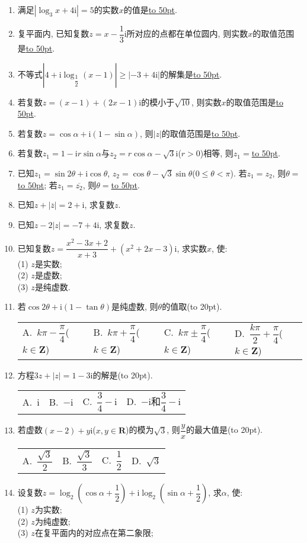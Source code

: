 \documentclass[10pt,a4paper]{article}
\newcommand{\blank}[1]{\underline{\hbox to #1pt{}}}
\newcommand{\bracket}[1]{(\hbox to #1pt{})}
\newcommand{\fourch}[4]{\par\begin{tabular}{p{.23\textwidth}p{.23\textwidth}p{.23\textwidth}p{.23\textwidth}}
A.~#1 &B.~#2& C.~#3& D.~#4
\end{tabular}}
\begin{document}
\begin{enumerate}[1.]
\item 满足$|\log _3x+4\mathrm{i}|=5$的实数$x$的值是\blank{50}.
\item 复平面内, 已知复数$z=x-\dfrac 13\mathrm{i}$所对应的点都在单位圆内, 则实数$x$的取值范围是\blank{50}.
\item 不等式$|4+\mathrm{i}\log _{\dfrac 12}(x-1)|\ge|-3+4\mathrm{i}|$的解集是\blank{50}.
\item 若复数$z=(x-1)+(2x-1)\mathrm{i}$的模小于$\sqrt {10}$, 则实数$x$的取值范围是\blank{50}.
\item 若复数$z=\cos \alpha +\mathrm{i}(1-\sin \alpha)$, 则$|z|$的取值范围是\blank{50}.
\item 若复数$z_1=1-\mathrm{i}r\sin \alpha$与$z_2=r\cos \alpha -\sqrt 3\mathrm{i}$($r>0$)相等, 则$z_1=$\blank{50}.
\item 已知$z_1=\sin 2\theta +\mathrm{i}\cos \theta$, $z_2=\cos \theta -\sqrt 3\sin \theta$($0\le \theta <\pi$). 若$z_1=z_2$, 则$\theta =$\blank{50}; 若$z_1=\overline{z_2}$, 则$\theta =$\blank{50}.
\item 已知$z+|\overline z|=2+\mathrm{i}$, 求复数$z$.
\item 已知$z-2|z|=-7+4\mathrm{i}$, 求复数$z$.
\item 已知复数$z=\dfrac{{x^2}-3x+2}{x+3}+(x^2+2x-3)\mathrm{i}$, 求实数$x$, 使:\\
(1) $z$是实数;\\
(2) $z$是虚数;\\
(3) $z$是纯虚数.
\item 若$\cos 2\theta +\mathrm{i}(1-\tan \theta)$是纯虚数, 则$\theta$的值取\bracket{20}.
\fourch{$k\pi -\dfrac{\pi }4$($k\in \mathbf{Z}$)}{$k\pi +\dfrac{\pi }4$($k\in \mathbf{Z}$)}{$k\pi \pm \dfrac{\pi }4$($k\in \mathbf{Z}$)}{$\dfrac{k\pi }2+\dfrac{\pi }4$($k\in \mathbf{Z}$)}
\item 方程$3z+|z|=1-3\mathrm{i}$的解是\bracket{20}.
\fourch{$\mathrm{i}$}{$-\mathrm{i}$}{$\dfrac 34-\mathrm{i}$}{$-\mathrm{i}$和$\dfrac 34-\mathrm{i}$}
\item 若虚数$(x-2)+y\mathrm{i}$($x,y\in \mathbf{R}$)的模为$\sqrt 3$, 则$\dfrac yx$的最大值是\bracket{20}.
\fourch{$\dfrac{\sqrt 3}2$}{$\dfrac{\sqrt 3}3$}{$\dfrac 12$}{$\sqrt 3$}
\item 设复数$z=\log _2(\cos \alpha +\dfrac 12)+\mathrm{i}\log _2(\sin \alpha +\dfrac 12)$, 求$\alpha$, 使:\\
(1) $z$为实数;\\
(2) $z$为纯虚数;\\
(3) $z$在复平面内的对应点在第二象限;\\

\end{enumerate}
\end{document}

